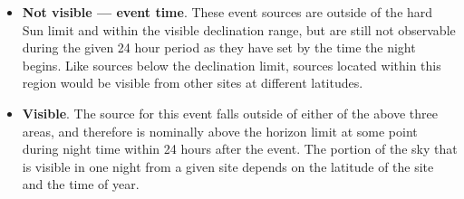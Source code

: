 \begin{colsection}
\begin{colsection}
\begin{itemize}
    \item \textbf{Not visible --- event time}. These event sources are outside of the hard Sun limit and within the visible declination range, but are still not observable during the given 24 hour period as they have set by the time the night begins. Like sources below the declination limit, sources located within this region would be visible from other sites at different latitudes.

    \item \textbf{Visible}. The source for this event falls outside of either of the above three areas, and therefore is nominally above the horizon limit at some point during night time within 24 hours after the event. The portion of the sky that is visible in one night from a given site depends on the latitude of the site and the time of year.
\end{itemize}


\end{colsection}
\end{colsection}
